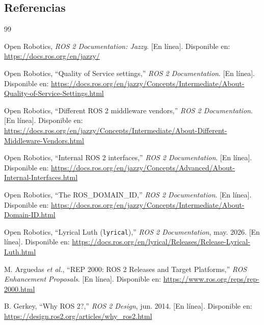 \documentclass[DOC]{UTNLSE}
\begin{document}
\subsection{Referencias}
\begingroup
\renewcommand{\section}[2]{}
\begin{thebibliography}{99}

Open Robotics, \emph{ROS 2 Documentation: Jazzy}. [En línea]. Disponible en:
\url{https://docs.ros.org/en/jazzy/}

Open Robotics, ``Quality of Service settings,'' \emph{ROS 2 Documentation}.
[En línea]. Disponible en:
\url{https://docs.ros.org/en/jazzy/Concepts/Intermediate/About-Quality-of-Service-Settings.html}

Open Robotics, ``Different ROS 2 middleware vendors,'' \emph{ROS 2
Documentation}. [En línea]. Disponible en:
\url{https://docs.ros.org/en/jazzy/Concepts/Intermediate/About-Different-Middleware-Vendors.html}

Open Robotics, ``Internal ROS 2 interfaces,'' \emph{ROS 2 Documentation}.
[En línea]. Disponible en:
\url{https://docs.ros.org/en/jazzy/Concepts/Advanced/About-Internal-Interfaces.html}

Open Robotics, ``The ROS\_DOMAIN\_ID,'' \emph{ROS 2 Documentation}. [En línea].
Disponible en:
\url{https://docs.ros.org/en/jazzy/Concepts/Intermediate/About-Domain-ID.html}

Open Robotics, ``Lyrical Luth (\texttt{lyrical}),'' \emph{ROS 2
Documentation}, may. 2026. [En línea]. Disponible en:
\url{https://docs.ros.org/en/lyrical/Releases/Release-Lyrical-Luth.html}

M. Arguedas \emph{et al.}, ``REP 2000: ROS 2 Releases and Target Platforms,''
\emph{ROS Enhancement Proposals}. [En línea]. Disponible en:
\url{https://www.ros.org/reps/rep-2000.html}

B. Gerkey, ``Why ROS 2?,'' \emph{ROS 2 Design}, jun. 2014. [En línea]. Disponible en:
\url{https://design.ros2.org/articles/why_ros2.html}


\end{thebibliography}
\end{document}
